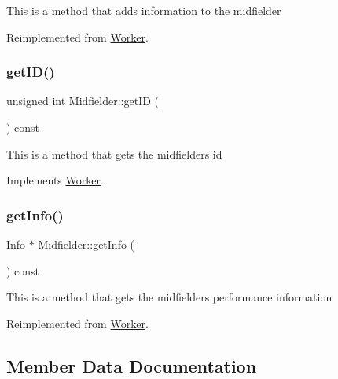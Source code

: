 This is a method that adds information to the midfielder 

Reimplemented from \hyperlink{class_worker_ad54db262f7473cc729c371dd54e292eb}{Worker}.

\hypertarget{class_midfielder_ac55e51de4a6544c30ef2471b6c160d2b}{}\label{class_midfielder_ac55e51de4a6544c30ef2471b6c160d2b} 
\subsubsection{\texorpdfstring{get\+I\+D()}{getID()}}
{\footnotesize\ttfamily unsigned int Midfielder\+::get\+ID (\begin{DoxyParamCaption}{ }\end{DoxyParamCaption}) const\hspace{0.3cm}{\ttfamily [virtual]}}

This is a method that gets the midfielder\textquotesingle{}s id 

Implements \hyperlink{class_worker_a8b3e221c4a1ebd12ade03ee9b9c86182}{Worker}.

\hypertarget{class_midfielder_a18c2c163951dd942685950ac562f3b24}{}\label{class_midfielder_a18c2c163951dd942685950ac562f3b24} 
\subsubsection{\texorpdfstring{get\+Info()}{getInfo()}}
{\footnotesize\ttfamily \hyperlink{class_info}{Info} $\ast$ Midfielder\+::get\+Info (\begin{DoxyParamCaption}{ }\end{DoxyParamCaption}) const\hspace{0.3cm}{\ttfamily [virtual]}}

This is a method that gets the midfielder\textquotesingle{}s performance information 

Reimplemented from \hyperlink{class_worker_a95a4f7c750644937859b8e14515a480e}{Worker}.



\subsection{Member Data Documentation}
\hypertarget{class_midfielder_aa3b78958ffc35755ca4a06aa642115e5}{}\label{class_midfielder_aa3b78958ffc35755ca4a06aa642115e5} 
